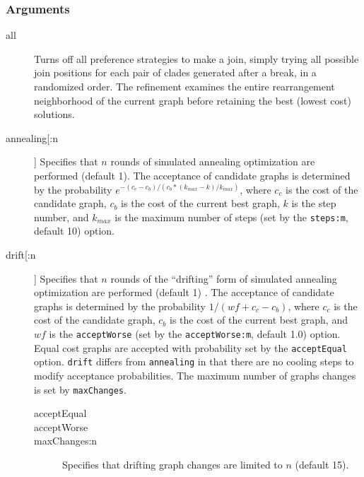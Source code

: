 	\subsubsection{Arguments}
		\begin{description}
			\item[all]  Turns off all preference strategies to make a join, simply trying all possible 
			join positions for each pair of clades generated after a break, in a randomized order. 
			The refinement examines the entire rearrangement neighborhood of the current graph 
			before retaining the best (lowest cost) solutions.
		
			\item[annealing[:n]] Specifies that $n$ rounds of simulated annealing \citep{Metropolisetal1953, 
			Kirkpatricketal1983, Cerny1985} optimization are performed (default 1). The acceptance 
			of candidate graphs is determined by the probability $e ^ {- (c_c - c_b)/ (c_b * (k_{max} -k)/ k_{max})}$, 
			where $c_c$ is the cost of the candidate graph, $c_b$ is the cost of the current best graph, $k$ 
			is the step number, and $k_{max}$ is the maximum number of steps (set by the \texttt{steps:m}, 
			default 10) option.
		
			\item[drift[:n]] Specifies that $n$ rounds of the ``drifting'' form of simulated annealing 
			\citep{goloboff1999} optimization are performed (default 1) . The acceptance of candidate 
			graphs is determined by the probability $1/ (wf + c_c - c_b)$, where $c_c$ is the cost 
			of the candidate graph, $c_b$ is the cost of the current best graph, and $wf$ is the 
			\texttt{acceptWorse} (set by the \texttt{acceptWorse:m}, default 1.0) option. Equal 
			cost graphs are accepted with probability set by the \texttt{acceptEqual}  option. 
			\texttt{drift} differs from \texttt{annealing} in that there are no cooling steps to modify 
			acceptance probabilities. The maximum number of graphs changes is set by 
			\texttt{maxChanges}.
			
			\begin{description}
			
			\item[acceptEqual] 
			
			\item[acceptWorse] 
			
			\item[maxChanges:n] Specifies that drifting graph changes are limited to $n$ (default 15).
			
			\end{description}
		

\end{description}
